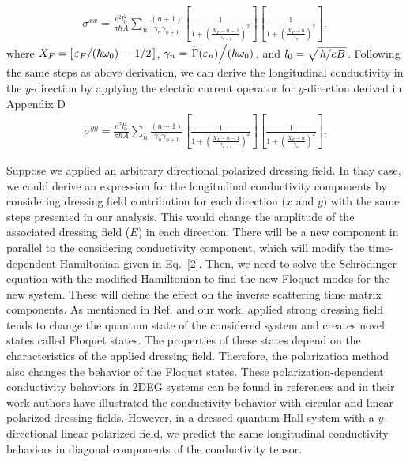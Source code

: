 \documentclass{article}
\begin{document}
\begin{itemize}
{\begin{equation}
    \begin{aligned}
      \sigma^{xx}  =
      \frac{e^2l_0^2}{\pi\hbar A}
      \sum_{n}
      \frac{(n+1)}{\gamma_{n}\gamma_{n+1}}
      \left[
        \frac{1}
        {
          1 + \left(\frac{X_F - n -1}{\gamma_{n+1}}\right)^2
        }
      \right]
      \left[
        \frac{1}
        {
          1 + \left(\frac{X_F - n}{\gamma_{n}}\right)^2
        }
      \right],
    \end{aligned}
  \end{equation}
  where $X_F = \left[\flatfrac{\varepsilon_F}{(\hbar \omega_0)} - \flatfrac{1}{2}\right]$,
  $\gamma_n = \flatfrac{\widetilde{{\Gamma}}(\varepsilon_n)}{(\hbar \omega_0)}$, and $l_0 = \sqrt{\flatfrac{\hbar}{eB}}$.
  Following the same steps as above derivation, we can derive the longitudinal conductivity in the $y$-direction by applying the electric current operator for $y$-direction derived in Appendix D
  \begin{equation} \tag{36}
    \begin{aligned}
      {\sigma}^{yy} =
      \frac{e^2l_0^2}{\pi\hbar A}
      \sum_{n}
      \frac{(n+1)}{\gamma_{n}\gamma_{n+1}}
      \left[
        \frac{1}
        {
          1 + \left(\frac{X_F - n -1}{\gamma_{n+1}}\right)^2
        }
      \right]
      \left[
        \frac{1}
        {
          1 + \left(\frac{X_F - n}{\gamma_{n}}\right)^2
        }
      \right].
    \end{aligned}
  \end{equation}
  }
\end{itemize}

Suppose we applied an arbitrary directional polarized dressing field. In thay case, we could derive an expression for the longitudinal conductivity components by considering dressing field contribution for each direction ($x$ and $y$) with the same steps presented in our analysis. This would change the amplitude of the associated dressing field ($E$) in each direction. There will be a new component in parallel to the considering conductivity component, which will modify the time-dependent Hamiltonian given in Eq.~[2]. Then, we need to solve the Schrödinger equation with the modified Hamiltonian to find the new Floquet modes for the new system. These will define the effect on the inverse scattering time matrix components. As mentioned in Ref. \cite{wackerl20} and our work, applied strong dressing field tends to change the quantum state of the considered system and creates novel states called Floquet states. The properties of these states depend on the characteristics of the applied dressing field. Therefore, the polarization method also changes the behavior of the Floquet states. These polarization-dependent conductivity behaviors in 2DEG systems can be found in references \cite{wackerl20,morina15} and in their work authors have illustrated the conductivity behavior with circular and linear polarized dressing fields. However, in a dressed quantum Hall system with a $y$-directional linear polarized field, we predict the same longitudinal conductivity behaviors in diagonal components of the conductivity tensor.
\end{document}
